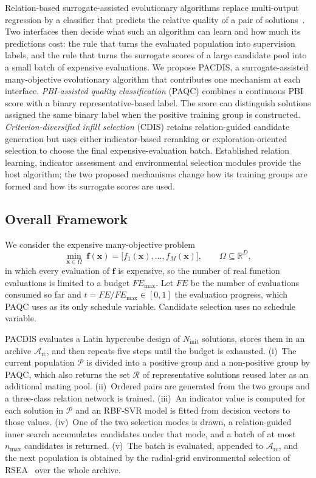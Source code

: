 \documentclass[final,5p,times,twocolumn]{elsarticle}
\newcommand{\vf}{\mathbf{f}}
\newcommand{\vx}{\mathbf{x}}
\begin{document}
Relation-based surrogate-assisted evolutionary algorithms replace multi-output
regression by a classifier that predicts the relative quality of a pair of
solutions~\cite{ref:remo}. Two interfaces then decide what such an algorithm
can learn and how much its predictions cost: the rule that turns the evaluated
population into supervision labels, and the rule that turns the surrogate
scores of a large candidate pool into a small batch of expensive evaluations.
We propose PACDIS, a surrogate-assisted many-objective evolutionary
algorithm that contributes one mechanism at each interface.
\emph{PBI-assisted quality classification} (PAQC) combines a continuous PBI
score with a binary representative-based label. The score can distinguish
solutions assigned the same binary label when the positive training group is
constructed. \emph{Criterion-diversified infill selection} (CDIS) retains relation-guided candidate
generation but uses either indicator-based reranking or exploration-oriented
selection to choose the final expensive-evaluation batch. Established relation
learning, indicator assessment and environmental selection modules provide the
host algorithm; the two proposed mechanisms change how its training groups are
formed and how its surrogate scores are used.

\subsection{Overall Framework}
\label{sec:method:framework}

We consider the expensive many-objective problem
\begin{equation}
\min_{\vx\in\Omega}\;
\vf(\vx)=\bigl[f_1(\vx),\ldots,f_M(\vx)\bigr],
\qquad
\Omega\subseteq\mathbb{R}^{D},
\label{eq:problem}
\end{equation}
in which every evaluation of $\vf$ is expensive, so the number of real function
evaluations is limited to a budget $FE_{\max}$. Let $FE$ be the number of
evaluations consumed so far and $t=FE/FE_{\max}\in[0,1]$ the evaluation
progress, which PAQC uses as its only schedule variable. Candidate selection
uses no schedule variable.

PACDIS evaluates a Latin hypercube design of $N_{\mathrm{init}}$ solutions,
stores them in an archive $\mathcal{A}_{\mathrm{rc}}$, and then repeats five
steps until the budget is exhausted. (i)~The current population $\mathcal{P}$
is divided into a positive group and a non-positive group by
PAQC, which also returns the set $\mathcal{R}$ of
representative solutions reused later as an additional mating pool.
(ii)~Ordered pairs are generated from the two groups and a three-class relation
network is trained.
(iii)~An indicator value is computed for each solution in $\mathcal{P}$ and an
RBF-SVR model is fitted from decision vectors to those values.
(iv)~One of the two selection modes is drawn, a relation-guided inner search
accumulates candidates under that mode, and a batch of at most $n_{\max}$ candidates is
returned. (v)~The batch is evaluated, appended to
$\mathcal{A}_{\mathrm{rc}}$, and the next population is obtained by the
radial-grid environmental selection of RSEA~\cite{ref:rsea} over the whole
archive.
\end{document}
